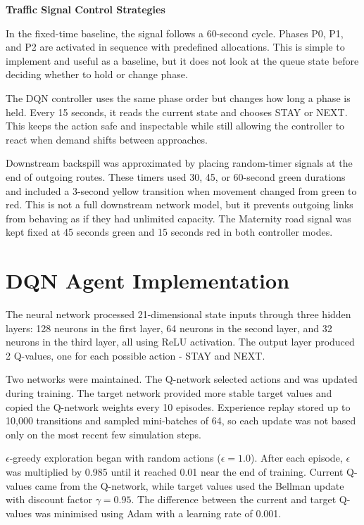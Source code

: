\textbf{Traffic Signal Control Strategies}

In the fixed-time baseline, the signal follows a 60-second cycle. Phases
P0, P1, and P2 are activated in sequence with predefined allocations.
This is simple to implement and useful as a baseline, but it does not
look at the queue state before deciding whether to hold or change phase.

The DQN controller uses the same phase order but changes how long a phase
is held. Every 15 seconds, it reads the current state and chooses STAY or
NEXT. This keeps the action safe and inspectable while still allowing the
controller to react when demand shifts between approaches.

Downstream backspill was approximated by placing random-timer signals at
the end of outgoing routes. These timers used 30, 45, or 60-second green
durations and included a 3-second yellow transition when movement changed
from green to red. This is not a full downstream network model, but it
prevents outgoing links from behaving as if they had unlimited capacity.
The Maternity road signal was kept fixed at 45 seconds green and 15
seconds red in both controller modes.

\section{DQN Agent Implementation}
\label{sec:dqn_agent}

The neural network processed 21-dimensional state inputs through three hidden layers: 128 neurons in the first layer, 64 neurons in the second layer, and 32 neurons in the third layer, all using ReLU activation. The output layer produced 2 Q-values, one for each possible action - STAY and NEXT.

Two networks were maintained. The Q-network selected actions and was
updated during training. The target network provided more stable target
values and copied the Q-network weights every 10 episodes. Experience
replay stored up to 10,000 transitions and sampled mini-batches of 64,
so each update was not based only on the most recent few simulation
steps.

$\epsilon$-greedy exploration began with random actions
($\epsilon = 1.0$). After each episode, $\epsilon$ was multiplied by
0.985 until it reached 0.01 near the end of training. Current Q-values
came from the Q-network, while target values used the Bellman update with
discount factor $\gamma = 0.95$. The difference between the current and
target Q-values was minimised using Adam with a learning rate of 0.001.


